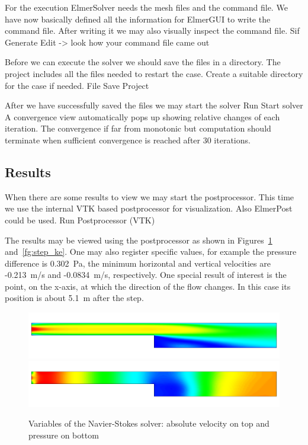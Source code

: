 For the execution 
ElmerSolver needs the mesh files and the command file. We have now basically defined
all the information for ElmerGUI to write the command file. After writing it we may also visually 
inspect the command file.
\ttbegin
Sif 
  Generate
  Edit -> look how your command file came out  
\ttend

Before we can execute the solver we should save the files in a directory. The project includes
all the files needed to restart the case. Create a suitable directory for the case if needed. 
\ttbegin
File 
  Save Project
\ttend

After we have successfully saved the files we may start the solver
\ttbegin
Run
  Start solver
\ttend
A convergence view automatically pops up showing relative changes of each iteration.
The convergence if far from monotonic but computation should terminate 
when sufficient convergence is reached after 30 iterations.


\subsection*{Results}

When there are some results to view we may start the postprocessor. This time we use the 
internal VTK based postprocessor for visualization. Also ElmerPost could be used. 
\ttbegin
Run
  Postprocessor (VTK)
\ttend

The results may be viewed using the postprocessor as shown in 
Figures~\ref{fg:step_ns} and~\ref{fg:step_ke}.
One may also register specific values,
for example the pressure difference is 0.302~Pa, the minimum horizontal and vertical velocities
are -0.213~m/s and -0.0834~m/s, respectively.
One special result of interest 
is the point, on the x-axis, at which the direction of the flow changes. 
In this case its position is about 5.1~m after the step. 

\begin{figure}[h]
\centering
\includegraphics[width=15cm]{step_ke_velo}
\includegraphics[width=15cm]{step_ke_pres}
\caption{Variables of the Navier-Stokes solver: absolute velocity on top and 
pressure on bottom}\label{fg:step_ns}
\end{figure} 

